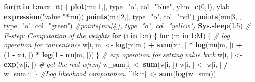 \documentclass[
]{article}
\newenvironment{Shaded}{\begin{snugshade}}{\end{snugshade}}
\newcommand{\AttributeTok}[1]{\textcolor[rgb]{0.13,0.29,0.53}{#1}}
\newcommand{\CommentTok}[1]{\textcolor[rgb]{0.56,0.35,0.01}{\textit{#1}}}
\newcommand{\ControlFlowTok}[1]{\textcolor[rgb]{0.13,0.29,0.53}{\textbf{#1}}}
\newcommand{\DecValTok}[1]{\textcolor[rgb]{0.00,0.00,0.81}{#1}}
\newcommand{\FloatTok}[1]{\textcolor[rgb]{0.00,0.00,0.81}{#1}}
\newcommand{\FunctionTok}[1]{\textcolor[rgb]{0.13,0.29,0.53}{\textbf{#1}}}
\newcommand{\NormalTok}[1]{#1}
\newcommand{\OtherTok}[1]{\textcolor[rgb]{0.56,0.35,0.01}{#1}}
\newcommand{\SpecialCharTok}[1]{\textcolor[rgb]{0.81,0.36,0.00}{\textbf{#1}}}
\newcommand{\StringTok}[1]{\textcolor[rgb]{0.31,0.60,0.02}{#1}}
\begin{document}
\begin{Shaded}
\begin{Highlighting}[]
\ControlFlowTok{for}\NormalTok{(it }\ControlFlowTok{in} \DecValTok{1}\SpecialCharTok{:}\NormalTok{max\_it) \{}
  \FunctionTok{plot}\NormalTok{(mu[}\DecValTok{1}\NormalTok{,], }\AttributeTok{type=}\StringTok{"o"}\NormalTok{, }\AttributeTok{col=}\StringTok{"blue"}\NormalTok{, }\AttributeTok{ylim=}\FunctionTok{c}\NormalTok{(}\DecValTok{0}\NormalTok{,}\DecValTok{1}\NormalTok{), }\AttributeTok{ylab =} \FunctionTok{expression}\NormalTok{(}\StringTok{"value "}\SpecialCharTok{*}\NormalTok{mu))}
  \FunctionTok{points}\NormalTok{(mu[}\DecValTok{2}\NormalTok{,], }\AttributeTok{type=}\StringTok{"o"}\NormalTok{, }\AttributeTok{col=}\StringTok{"red"}\NormalTok{)}
  \FunctionTok{points}\NormalTok{(mu[}\DecValTok{3}\NormalTok{,], }\AttributeTok{type=}\StringTok{"o"}\NormalTok{, }\AttributeTok{col=}\StringTok{"green"}\NormalTok{)}
  \CommentTok{\#points(mu[4,], type="o", col="yellow")}
  \FunctionTok{Sys.sleep}\NormalTok{(}\FloatTok{0.5}\NormalTok{)}
  \CommentTok{\# E{-}step: Computation of the weights}
  \ControlFlowTok{for}\NormalTok{ (i }\ControlFlowTok{in} \DecValTok{1}\SpecialCharTok{:}\NormalTok{n) \{}
    \ControlFlowTok{for}\NormalTok{ (m }\ControlFlowTok{in} \DecValTok{1}\SpecialCharTok{:}\NormalTok{M) \{}
      \CommentTok{\# log operation for convenience}
\NormalTok{      w[i, m] }\OtherTok{\textless{}{-}} \FunctionTok{log}\NormalTok{(pi[m]) }\SpecialCharTok{+} \FunctionTok{sum}\NormalTok{(x[i, ] }\SpecialCharTok{*} \FunctionTok{log}\NormalTok{(mu[m, ]) }\SpecialCharTok{+}\NormalTok{ (}\DecValTok{1} \SpecialCharTok{{-}}\NormalTok{ x[i, ]) }\SpecialCharTok{*} \FunctionTok{log}\NormalTok{(}\DecValTok{1} \SpecialCharTok{{-}}\NormalTok{ mu[m, ]))}
\NormalTok{    \}}
    \CommentTok{\# exp operation for setting value back}
\NormalTok{    w[i, ] }\OtherTok{\textless{}{-}} \FunctionTok{exp}\NormalTok{(w[i, ])}
    \CommentTok{\# get the real w[i,m]}
\NormalTok{    w\_sum[i] }\OtherTok{\textless{}{-}} \FunctionTok{sum}\NormalTok{(w[i, ])}
\NormalTok{    w[i, ] }\OtherTok{\textless{}{-}}\NormalTok{ w[i, ] }\SpecialCharTok{/}\NormalTok{ w\_sum[i]}
\NormalTok{  \}}
  \CommentTok{\#Log likelihood computation.}
\NormalTok{  llik[it] }\OtherTok{\textless{}{-}} \FunctionTok{sum}\NormalTok{(}\FunctionTok{log}\NormalTok{(w\_sum))}
  

\end{Highlighting}
\end{Shaded}
\end{document}

